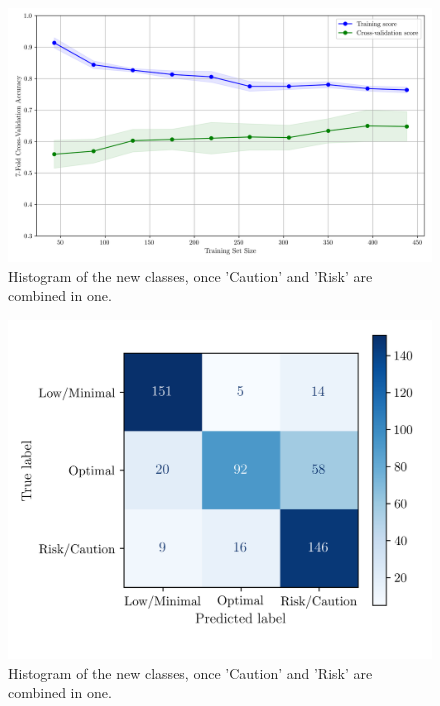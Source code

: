 \documentclass[conference]{IEEEtran}
\begin{document}
\begin{figure}[H]
    \centering
    \includegraphics[width=1\linewidth]{assets/SVM_LearningCurve.png}
    \caption{Histogram of the new classes, once 'Caution' and 'Risk' are combined in one.}
    \label{svm_learningcurve}
\end{figure}

\begin{figure}[H]
    \centering
    \includegraphics[width=1\linewidth]{assets/SVM_ConfusionMatrixTrain.png}
    \caption{Histogram of the new classes, once 'Caution' and 'Risk' are combined in one.}
    \label{svm_cm_train}
\end{figure}
\end{document}
